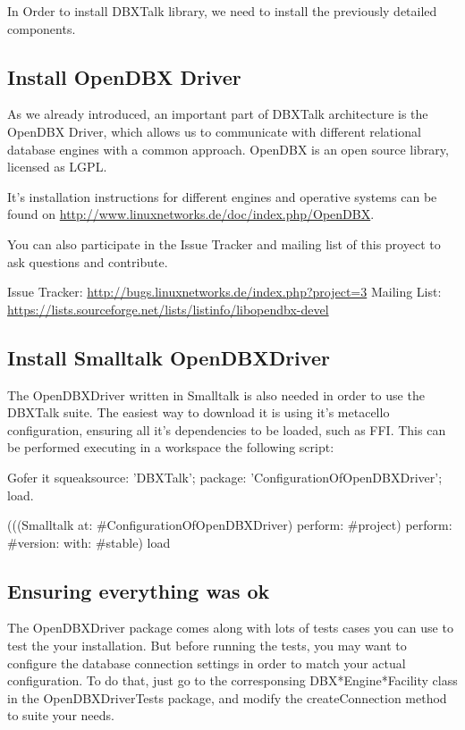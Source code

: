 \documentclass[a4paper,10pt,twoside]{book}
\begin{document}
In Order to install DBXTalk library, we need to install the previously detailed components.

\subsection*{Install OpenDBX Driver}

As we already introduced, an important part of DBXTalk architecture is the OpenDBX Driver, which allows us
to communicate with different relational database engines with a common approach.  OpenDBX is an open source library,
licensed as LGPL.

It's installation instructions for different engines and operative systems can be found on \url{http://www.linuxnetworks.de/doc/index.php/OpenDBX}.

You can also participate in the Issue Tracker and mailing list of this proyect to ask questions and contribute.

Issue Tracker: \url{http://bugs.linuxnetworks.de/index.php?project=3}
Mailing List: \url{https://lists.sourceforge.net/lists/listinfo/libopendbx-devel}

\subsection*{Install Smalltalk OpenDBXDriver}

The OpenDBXDriver written in Smalltalk is also needed in order to use the DBXTalk suite.  The easiest way to download it
is using it's metacello configuration, ensuring all it's dependencies to be loaded, such as FFI.  This can be performed executing
in a workspace the following script:

\begin{code}
Gofer it
	squeaksource: 'DBXTalk';
	package: 'ConfigurationOfOpenDBXDriver';
	load.
	
(((Smalltalk at: #ConfigurationOfOpenDBXDriver) perform: #project) perform: #version: with: #stable) load
\end{code}

\subsection*{Ensuring everything was ok}

The OpenDBXDriver package comes along with lots of tests cases you can use to test the your installation.  But before running
 the tests, you may want to configure the database connection settings in order to match your actual configuration.
To do that, just go to the corresponsing DBX*Engine*Facility class in the OpenDBXDriverTests package, and modify the
createConnection method to suite your needs.
\end{document}

